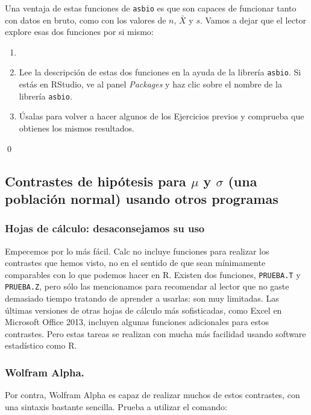 \documentclass[10pt,a4paper]{article}\usepackage[]{graphicx}\usepackage[]{color}
\newcounter {cont01}
\begin{document}
Una ventaja de estas funciones de {\tt asbio} es que son capaces de funcionar tanto con datos en bruto, como con los valores de $n$, $\bar X$ y $s$. Vamos a dejar que el lector explore esas dos funciones por si mismo:

\begin{ejercicio}
\label{tut07:ejercicio15}
\begin{enumerate}
  \item[]
  \item Lee la descripción de estas dos funciones en la ayuda de la librería {\tt asbio}. Si estás en RStudio, ve al panel {\em Packages} y haz clic sobre el nombre de la librería {\tt asbio}.
  \item Úsalas para volver a hacer algunos de los Ejercicios previos y comprueba que obtienes los mismos resultados.
\end{enumerate}
\qed
\end{ejercicio}


\subsection{Contrastes de hipótesis para $\mu$ y $\sigma$ (una población normal) usando otros programas}

\subsubsection*{Hojas de cálculo: desaconsejamos su uso}

Empecemos por lo más fácil. Calc no incluye funciones para realizar los contrastes que hemos visto, no en el sentido de que sean mínimamente comparables con lo que podemos hacer en R. Existen dos funciones, {\tt PRUEBA.T} y {\tt PRUEBA.Z}, pero sólo las mencionamos para recomendar al lector que no gaste demasiado tiempo tratando de aprender a usarlas: son muy limitadas. Las últimas versiones de otras hojas de cálculo más sofisticadas, como Excel en Microsoft Office 2013, incluyen algunas funciones adicionales para estos contrastes. Pero estas tareas se realizan con mucha más facilidad usando software estadístico como R.

\subsubsection*{Wolfram Alpha.}

Por contra, Wolfram Alpha es capaz de realizar muchos de estos contrastes, con una sintaxis bastante sencilla. Prueba a utilizar el comando:
\end{document}
